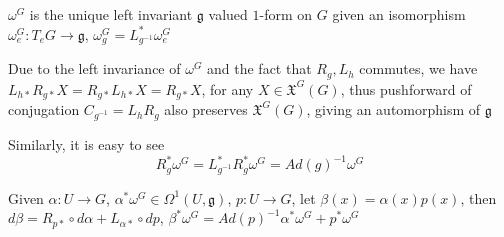\documentclass[../main.tex]{subfiles}
\begin{document}
\begin{remark}
$\omega^G$ is the unique left invariant $\mathfrak g$ valued $1$-form on $G$ given an isomorphism $\omega^G_e:T_eG\to\mathfrak g$, $\omega^G_g=L_{g^{-1}}^*\omega^G_e$
\end{remark}

\begin{proposition}\label{Idetity 1 for Maurer-Cartan form}
Due to the left invariance of $\omega^G$ and the fact that $R_g,L_h$ commutes, we have $L_{h*}R_{g*}X=R_{g*}L_{h*}X=R_{g*}X$, for any $X\in\mathfrak X^G(G)$, thus pushforward of conjugation $C_{g^{-1}}=L_{h}R_g$ also preserves $\mathfrak X^G(G)$, giving an automorphism of $\mathfrak g$ \par
Similarly, it is easy to see
\[R_g^*\omega^G=L_{g^{-1}}^*R_g^*\omega^G=Ad(g)^{-1}\omega^G\]
\end{proposition}

\begin{proposition}\label{Idetity 2 for Maurer-Cartan form}
Given $\alpha:U\to G$, $\alpha^*\omega^G\in\Omega^1(U,\mathfrak g)$, $p:U\to G$, let $\beta(x)=\alpha(x)p(x)$, then $d\beta=R_{p*}\circ d\alpha+L_{\alpha*}\circ dp$, $\beta^*\omega^G=Ad(p)^{-1}\alpha^*\omega^G+p^*\omega^G$
\end{proposition}
\end{document}
